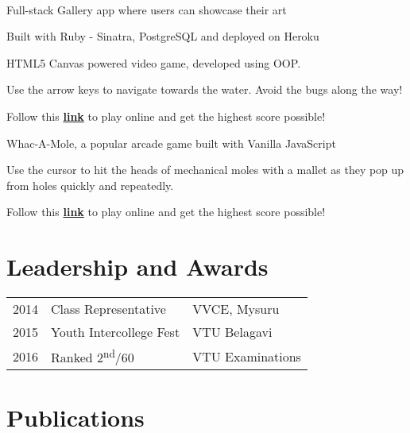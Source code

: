 \documentclass[]{deedy-resume-openfont}
\begin{document}
\begin{minipage}[t]{0.66\textwidth}
\\
\begin{tightemize}
\item Full-stack Gallery app where users can showcase their art
\item Built with Ruby - Sinatra, PostgreSQL and deployed on Heroku 
\end{tightemize}
\sectionsep

\begin{tightemize}
\item HTML5 Canvas powered video game, developed using OOP.
\item Use the arrow keys to navigate towards the water. Avoid the bugs along the way!
\item Follow this \textbf{ \href{https://manubhargav.github.io/frogger/}{link} } to play online and get the highest score possible!
\end{tightemize}
\sectionsep

\begin{tightemize}
\item Whac-A-Mole, a popular arcade game built with Vanilla JavaScript
\item Use the cursor to hit the heads of mechanical moles with a mallet as they pop up from holes quickly and repeatedly.
\item Follow this \textbf{ \href{https://manubhargav.github.io/Whack-a-mole/}{link} } to play online and get the highest score possible!
\end{tightemize}
\sectionsep


\section{Leadership and Awards} 
\begin{tabular}{rll}
2014	     & Class Representative  & VVCE, Mysuru\\
2015	     & Youth Intercollege Fest  & VTU Belagavi\\
2016	     & Ranked 2\textsuperscript{nd}/60  & VTU Examinations\\


\end{tabular}
\sectionsep


\section{Publications} 
\renewcommand\refname{\vskip -1.5em} %


\nocite{*}

\end{minipage} 
\end{document}
